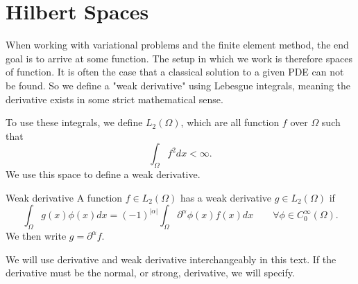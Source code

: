 \section{Hilbert Spaces}
When working with variational problems and the finite 
element method, the end goal is to arrive at some function.
The setup in which we work is therefore spaces of function. 
It is often the case that a classical solution to a given PDE can 
not be found. 
So we define a "weak derivative" using Lebesgue integrals, meaning 
the derivative exists in some strict mathematical sense. 

To use these integrals, we define $L_2(\Omega)$, which are all 
function $f$ over $\Omega$ such that 
\begin{equation*}
   \int_\Omega f^2 dx < \infty. 
\end{equation*}
We use this space to define a weak derivative.
\begin{defn}{Weak derivative}
    A function $f \in L_2(\Omega)$ has a weak derivative $g \in L_2(\Omega)$
    if
    \begin{equation*}
        \int_\Omega g(x)\phi(x) dx = (-1)^{|\alpha|}\int_\Omega 
        \partial ^{\alpha}\phi(x) f(x) dx
        \quad\quad \forall \phi \in C^\infty_0(\Omega).
    \end{equation*}
    We then write $g=\partial ^{\alpha}f$.
    \label{def:weak_derivative}
\end{defn}
We will use derivative and weak derivative interchangeably in this 
text.
If the derivative must be the normal, or strong, derivative, we will 
specify. 

